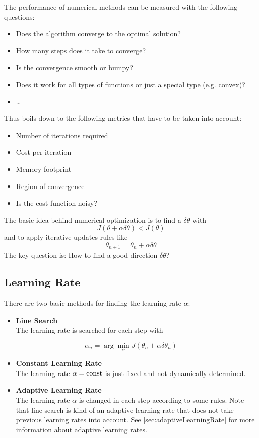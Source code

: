 		The performance of numerical methods can be measured with the following questions:
		\begin{itemize}
			\item Does the algorithm converge to the optimal solution?
			\item How many steps does it take to converge?
			\item Is the convergence smooth or bumpy?
			\item Does it work for all types of functions or just a special type (e.g. convex)?
			\item \dots
		\end{itemize}
		Thus boils down to the following metrics that have to be taken into account:
		\begin{itemize}
			\item Number of iterations required
			\item Cost per iteration
			\item Memory footprint
			\item Region of convergence
			\item Is the cost function noisy?
		\end{itemize}

		The basic idea behind numerical optimization is to find a \( \delta\theta \) with
		\begin{equation}
			J(\theta + \alpha\delta\theta) < J(\theta)
		\end{equation}
		and to apply iterative updates rules like
		\begin{equation}
			\theta_{n+1} = \theta_n + \alpha\delta\theta
		\end{equation}
		The key question is: How to find a good direction \(\delta\theta\)?

		\subsection{Learning Rate}
			There are two basic methods for finding the learning rate \(\alpha\):
			\begin{itemize}
				\item \textbf{Line Search} \\ The learning rate is searched for each step with
			\end{itemize}
			\begin{equation}
				\alpha_n = \arg\min_\alpha J(\theta_n + \alpha\delta\theta_n)
			\end{equation}
			\begin{itemize}
				\item \textbf{Constant Learning Rate} \\ The learning rate \( \alpha = \operatorname{const} \) is just fixed and not dynamically determined.
				\item \textbf{Adaptive Learning Rate} \\ The learning rate \( \alpha \) is changed in each step according to some rules. Note that line search is kind of an adaptive learning rate that does not take previous learning rates into account. See \ref{sec:adaptiveLearningRate} for more information about adaptive learning rates.
			\end{itemize}

